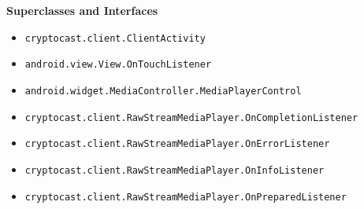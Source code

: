 \textbf{\sffamily Superclasses and Interfaces}
\begin{itemize}
\item \lstinline|cryptocast.client.ClientActivity|
\item \lstinline|android.view.View.OnTouchListener|
\item \lstinline|android.widget.MediaController.MediaPlayerControl|
\item \lstinline|cryptocast.client.RawStreamMediaPlayer.OnCompletionListener|
\item \lstinline|cryptocast.client.RawStreamMediaPlayer.OnErrorListener|
\item \lstinline|cryptocast.client.RawStreamMediaPlayer.OnInfoListener|
\item \lstinline|cryptocast.client.RawStreamMediaPlayer.OnPreparedListener|
\end{itemize}



